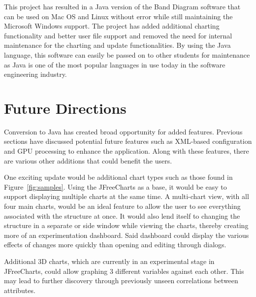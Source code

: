 \documentclass[project]{bsu-ms}
\begin{document}
This project has resulted in a Java version of the Band Diagram software that can be used on Mac OS and Linux without error while still maintaining the Microsoft Windows support. The project has added additional charting functionality and better user file support and removed the need for internal maintenance for the charting and update functionalities. By using the Java language, this software can easily be passed on to other students for maintenance as Java is one of the most popular languages in use today in the software engineering industry.



\section{Future Directions}\label{sec:futureDirections}

Conversion to Java has created broad opportunity for added features. Previous sections have discussed potential future features such as XML-based configuration and GPU processing to enhance the application. Along with these features, there are various other additions that could benefit the users.

One exciting update would be additional chart types such as those found in Figure~\ref{fig:samples}. Using the JFreeCharts as a base, it would be easy to support displaying multiple charts at the same time. A multi-chart view, with all four main charts, would be an ideal feature to allow the user to see everything associated with the structure at once. It would also lend itself to changing the structure in a separate or side window while viewing the charts, thereby creating more of an experimentation dashboard. Said dashboard could display the various effects of changes more quickly than opening and editing through dialogs. 

Additional 3D charts, which are currently in an experimental stage in JFreeCharts, could allow graphing 3 different variables against each other. This may lead to further discovery through previously unseen correlations between attributes.
\end{document}
